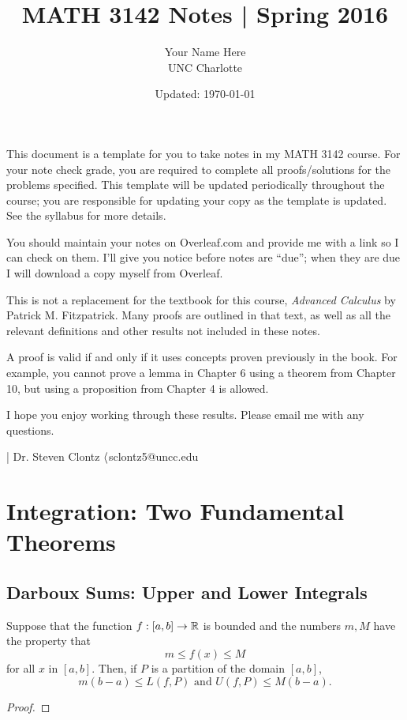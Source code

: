 \documentclass[letterpaper, twoside, 12pt]{book}
\title{MATH 3142 Notes | Spring 2016}
\date{Updated: \today}
\author{Your Name Here\\ UNC Charlotte}
\begin{document}
\maketitle

This document is a template for you to take notes in my MATH 3142 course.
For your note check grade, you are required to complete all proofs/solutions
for the problems specified. This template will be updated periodically
throughout the course; you are responsible for updating your copy
as the template is updated. See the syllabus for more details.

You should maintain your notes on Overleaf.com and provide me with a
link so I can check on them. I'll give you notice before notes are ``due'';
when they are due I will download a copy myself from Overleaf.

This is not a replacement for the textbook for this course,
\textit{Advanced Calculus} by Patrick M. Fitzpatrick. Many proofs are
outlined in that text, as well as all the relevant definitions and other
results not included in these notes.

A proof is valid if and only if it uses concepts proven previously in
the book. For example, you cannot prove a lemma in Chapter 6 using
a theorem from Chapter 10, but using a proposition from Chapter 4
is allowed.

I hope you enjoy working through these results. Please email me with
any questions.

\noindent| Dr. Steven Clontz \(\langle\)sclontz5@uncc.edu\(\>\)
















\setcounter{chapter}{5}
\chapter{Integration: Two Fundamental Theorems}







\section{Darboux Sums: Upper and Lower Integrals}

\begin{lemma}[6.1]
  Suppose that the function \(f:[a,b]\to\mathbb R\) is bounded and the numbers
  \(m,M\) have the property that
  \[
    m\leq f(x)\leq M
  \]
  for all \(x\) in \([a,b]\). Then, if \(P\) is a partition of the domain
  \([a,b]\),
  \[
    m(b-a)\leq L(f,P)
      \text{ and }
    U(f,P)\leq M(b-a)
  .\]
\end{lemma}
\begin{proof}

\end{proof}
\end{document}
